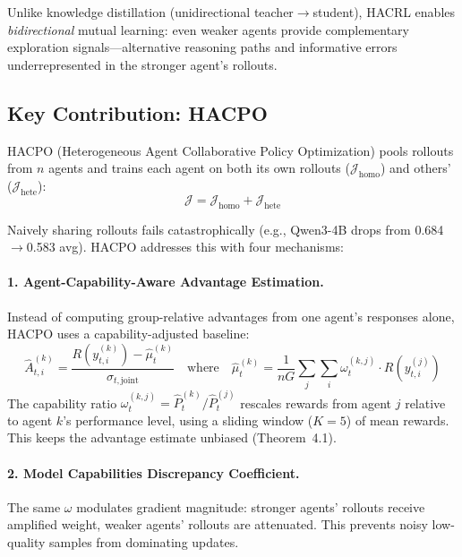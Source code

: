 \documentclass[11pt]{article}
\begin{document}
Unlike knowledge distillation (unidirectional teacher$\to$student), HACRL enables \emph{bidirectional} mutual learning: even weaker agents provide complementary exploration signals---alternative reasoning paths and informative errors underrepresented in the stronger agent's rollouts.

\subsection{Key Contribution: HACPO}

HACPO (Heterogeneous Agent Collaborative Policy Optimization) pools rollouts from $n$ agents and trains each agent on both its own rollouts ($\mathcal{J}_{\text{homo}}$) and others' ($\mathcal{J}_{\text{hete}}$):
\begin{equation}
    \mathcal{J} = \mathcal{J}_{\text{homo}} + \mathcal{J}_{\text{hete}}
\end{equation}

Naively sharing rollouts fails catastrophically (e.g., Qwen3-4B drops from 0.684$\to$0.583 avg). HACPO addresses this with four mechanisms:

\paragraph{1. Agent-Capability-Aware Advantage Estimation.} Instead of computing group-relative advantages from one agent's responses alone, HACPO uses a capability-adjusted baseline:
\begin{equation}
    \hat{A}_{t,i}^{(k)} = \frac{R(y_{t,i}^{(k)}) - \hat{\mu}_t^{(k)}}{\sigma_{t,\text{joint}}} \quad\text{where}\quad \hat{\mu}_t^{(k)} = \frac{1}{nG}\sum_{j}\sum_{i} \omega_t^{(k,j)} \cdot R(y_{t,i}^{(j)})
\end{equation}
The capability ratio $\omega_t^{(k,j)} = \hat{P}_t^{(k)} / \hat{P}_t^{(j)}$ rescales rewards from agent $j$ relative to agent $k$'s performance level, using a sliding window ($K{=}5$) of mean rewards. This keeps the advantage estimate unbiased (Theorem~4.1).

\paragraph{2. Model Capabilities Discrepancy Coefficient.} The same $\omega$ modulates gradient magnitude: stronger agents' rollouts receive amplified weight, weaker agents' rollouts are attenuated. This prevents noisy low-quality samples from dominating updates.
\end{document}
